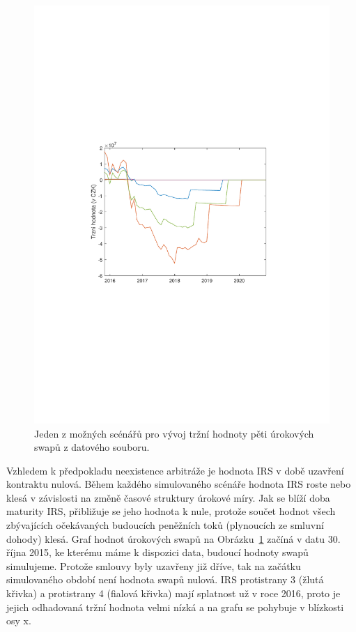 \documentclass[a4paper,12pt]{report}
\theoremstyle{definition} \newtheorem{definice}[veta]{Definice}
\theoremstyle{remark}
\begin{document}
\begin{figure}[!htbp]
  \centering 
	\includegraphics[width=13cm, clip, trim= 90 270 110 270]{IMG/Trzni_hodnota.pdf}
     \caption{Jeden z možných scénářů pro vývoj tržní hodnoty pěti úrokových swapů z datového souboru.}  \label{SwapPrice}
\end{figure}

Vzhledem k předpokladu neexistence arbitráže je hodnota IRS v době uzavření kontraktu nulová. 
Během každého simulovaného scénáře hodnota IRS roste nebo klesá v závislosti na změně časové struktury úrokové míry.
Jak se blíží doba maturity IRS, přibližuje se jeho hodnota k nule, protože součet hodnot všech zbývajících očekávaných budoucích peněžních toků (plynoucích ze smluvní dohody) klesá.   
Graf hodnot úrokových swapů na Obrázku~\ref{SwapPrice} začíná v datu 30. října 2015, ke kterému máme k dispozici data, budoucí hodnoty swapů simulujeme.
Protože smlouvy byly uzavřeny již dříve, tak na začátku simulovaného období není hodnota swapů nulová.
IRS protistrany 3 (žlutá křivka) a protistrany 4 (fialová křivka) mají splatnost už v roce 2016, proto je jejich odhadovaná tržní hodnota velmi nízká a na grafu se pohybuje v blízkosti osy x.
\end{document}
